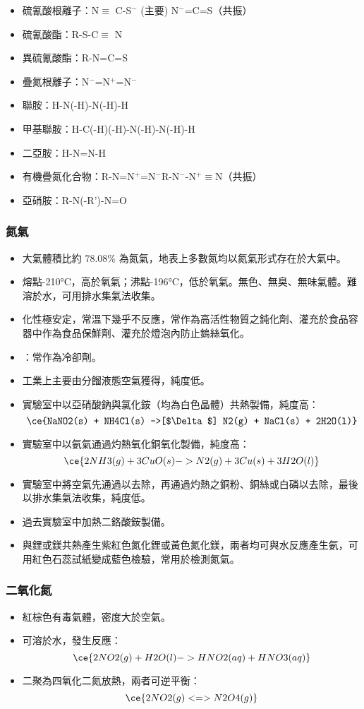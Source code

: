 \documentclass[a4paper,12pt]{report}
\begin{document}
\begin{itemize}
\item 硫氰酸根離子：N$\equiv$ C-S$^-$ (主要) \ce{<=>} N$^-$=C=S（共振）
\item 硫氰酸酯：R-S-C$\equiv$ N
\item 異硫氰酸酯：R-N=C=S
\item 疊氮根離子：N$^-$=N$^+$=N$^-$
\item 聯胺：H-N(-H)-N(-H)-H
\item 甲基聯胺：H-C(-H)(-H)-N(-H)-N(-H)-H
\item 二亞胺：H-N=N-H
\item 有機疊氮化合物：R-N=N$^+$=N$^-$\ce{<=>}R-N$^-$-N$^+\equiv$N（共振）
\item 亞硝胺：R-N(-R')-N=O
\end{itemize}
\subsubsection{氮氣}
\begin{itemize}
\item 大氣體積比約 78.08\% 為氮氣，地表上多數氮均以氮氣形式存在於大氣中。
\item 熔點-210°C，高於氧氣；沸點-196°C，低於氧氣。無色、無臭、無味氣體。難溶於水，可用排水集氣法收集。
\item 化性極安定，常溫下幾乎不反應，常作為高活性物質之鈍化劑、灌充於食品容器中作為食品保鮮劑、灌充於燈泡內防止鎢絲氧化。
\item {}：常作為冷卻劑。
\item 工業上主要由分餾液態空氣獲得，純度低。
\item 實驗室中以亞硝酸鈉與氯化銨（均為白色晶體）共熱製備，純度高：
\[\ce{NaNO2(s) + NH4Cl(s) ->[$\Delta$] N2(g) + NaCl(s) + 2H2O(l)}\]
\item 實驗室中以氨氣通過灼熱氧化銅氧化製備，純度高：
\[\ce{2NH3(g) + 3CuO(s) -> N2(g) + 3Cu(s) + 3H2O(l)}\]
\item 實驗室中將空氣先通過以去除，再通過灼熱之銅粉、銅絲或白磷以去除，最後以排水集氣法收集，純度低。
\item 過去實驗室中加熱二鉻酸銨製備。
\item 與鋰或鎂共熱產生紫紅色氮化鋰或黃色氮化鎂，兩者均可與水反應產生氨，可用紅色石蕊試紙變成藍色檢驗，常用於檢測氮氣。
\end{itemize}
\subsubsection{二氧化氮}
\begin{itemize}
\item 紅棕色有毒氣體，密度大於空氣。
\item 可溶於水，發生反應：
\[\ce{2NO2(g) + H2O(l) -> HNO2(aq) + HNO3(aq)}\]
\item 二聚為四氧化二氮放熱，兩者可逆平衡：
\[\ce{2NO2(g) <=> N2O4(g)}\]
\end{itemize}
\end{document}
